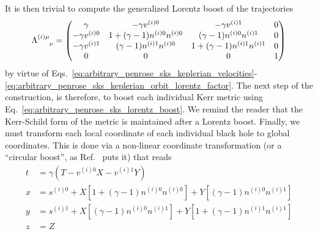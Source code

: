 It is then trivial to compute the generalized Lorentz boost of the trajectories
%
\begin{equation}
  \tens{\Lambda}{(i) \mu}{\nu} =
  \begin{pmatrix}
    \gamma            & -\gamma v^{(i) 0}              & -\gamma v^{(i) 1}              & 0 \\
    -\gamma v^{(i) 0} & 1+(\gamma-1) n^{(i)0} n^{(i)0} & (\gamma-1) n^{(i)0} n^{(i)1}   & 0 \\
    -\gamma v^{(i) 1} & (\gamma-1)n^{(i)1} n^{(i)0}    & 1+(\gamma-1) n^{(i)1} n^{(i)1} & 0 \\
    0                 & 0                              & 0                              & 1
  \end{pmatrix}
  \label{eq:arbitrary_penrose_sks_lorentz_boost}
\end{equation}
%
by virtue of Eqs.~\eqref{eq:arbitrary_penrose_sks_keplerian_velocities}-\eqref{eq:arbitrary_penrose_sks_keplerian_orbit_lorentz_factor}. The next step of the construction, is therefore, to boost each individual Kerr metric using Eq.~\eqref{eq:arbitrary_penrose_sks_lorentz_boost}. We remind the reader that the Kerr-Schild form of the metric is maintained after a Lorentz boost. Finally, we must transform each local coordinate of each individual black hole to global coordinates. This is done via a non-linear coordinate transformation (or a ``circular boost'', as Ref.~\cite{Armengol:2021shd} puts it) that reads
%
\begin{align}
  t & = \gamma \left( T - v^{(i) 0} X - v^{(i) 1} Y \right) \label{eq:arbitrary_penrose_sks_nonlinear_transformation_1}                                                                                          \\
  x & = s^{(i) 0} + X \left[ 1 + \left( \gamma - 1 \right) n^{(i) 0} n^{(i) 0}\right] + Y \left[\left( \gamma - 1 \right) n^{(i) 0} n^{(i) 1}\right] \label{eq:arbitrary_penrose_sks_nonlinear_transformation_2} \\
  y & = s^{(i) 1} + X \left[\left( \gamma - 1 \right) n^{(i) 0} n^{(i) 1}\right] + Y \left[1 + \left( \gamma - 1 \right) n^{(i) 1} n^{(i) 1}\right]  \label{eq:arbitrary_penrose_sks_nonlinear_transformation_3} \\
  z & = Z \label{eq:arbitrary_penrose_sks_nonlinear_transformation_4}
\end{align}

